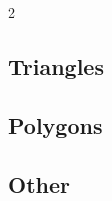 \documentclass[10pt, a4paper]{article}
\begin{document}
\begin{landscape}
\begin{multicols}{2}
\subsection{Triangles}
\raggedbottom
\subsection{Polygons}
\raggedbottom
\subsection{Other}
\raggedbottom
\null

\raggedbottom
\end{multicols}
\end{landscape}
\end{document}
